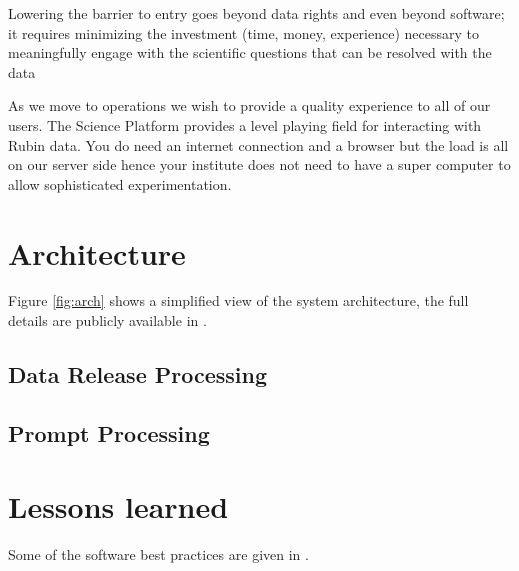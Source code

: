 \documentclass[11pt,twoside]{article}
\begin{document}
Lowering the barrier to entry goes beyond data rights and even beyond software; it requires minimizing the investment (time, money, experience) necessary to meaningfully engage with the scientific questions that can be resolved with the data

As we move to operations we wish to provide a quality experience to all of our users.
The Science Platform provides a level playing field for interacting with Rubin data.
You do need an internet connection and a browser but the load is all on our server side hence your institute does not need to have a super computer to allow sophisticated experimentation.



\section{Architecture}
 Figure \ref{fig:arch} shows a simplified view of the system architecture, the full details are publicly available in \citep{LDM-148}.



\begin{centering}
\end{centering}

\subsection{Data Release Processing}\label{sec:DRP}
\subsection{Prompt Processing} \label{sec:prompt}


\section{Lessons learned}
Some of the software best practices are given in \citet{2018SPIE10707E..09J}.


\end{document}
